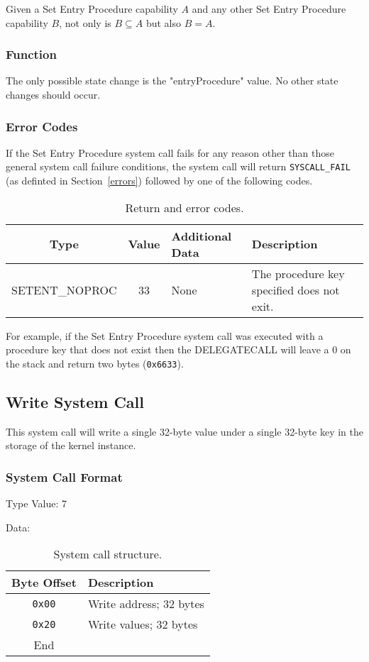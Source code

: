 \documentclass[english,a4paper]{article}
\let\oldparagraph\subsubsection
\renewcommand{\subsubsection}[1]{\oldparagraph{#1}\mbox{}}
\begin{document}
Given a Set Entry Procedure capability $A$ and any other Set Entry Procedure
capability $B$, not only is $B \subseteq A$ but also $B = A$.

\subsubsection{Function}
The only possible state change is the "entryProcedure" value. No other state
changes should occur.

\subsubsection{Error Codes}
If the Set Entry Procedure system call fails for any reason other than those
general system call failure conditions, the system call will return
\texttt{SYSCALL\_FAIL} (as definted in Section~\ref{errors}) followed by one of
the following codes.

\begin{table}[H]
  \caption{Return and error codes.}
  \centering{}%
  \begin{tabularx}{\textwidth}{c|c|l|X}
    \hline
    Type & Value & Additional Data & Description \\
    \hline
    \hline
    SETENT\_NOPROC  & 33 & None & The procedure key specified does not exit. \\
    \hline
  \end{tabularx}
\end{table}

For example, if the Set Entry
Procedure system call was executed with a procedure key that does not exist then
the DELEGATECALL will leave a 0 on the stack and return two bytes
(\texttt{0x6633}).

\subsection{Write System Call}
This system call will write a single 32-byte value under a single 32-byte key in
the storage of the kernel instance.

\subsubsection{System Call Format}
Type Value: 7

Data:

\begin{table}[H]
  \caption{System call structure.}
  \centering{}%
  \begin{tabularx}{\textwidth}{c|X}
    \hline
    Byte Offset & Description\\
    \hline
    \hline
    \texttt{0x00} & Write address; 32 bytes \\
    \texttt{0x20} & Write values; 32 bytes \\
    \hline
    End &  \\
    \hline
  \end{tabularx}
\end{table}
\end{document}
